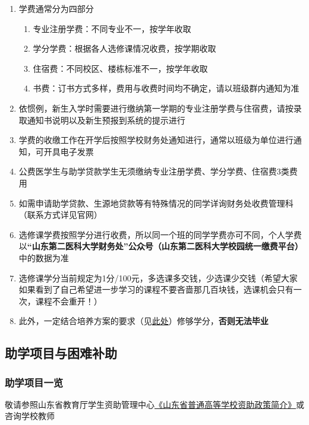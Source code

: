 \begin{enumerate}
    \item 学费通常分为四部分\footnotemark
          \begin{enumerate}
              \item 专业注册学费：不同专业不一，按学年收取
              \item 学分学费：根据各人选修课情况收费，按学期收取
              \item 住宿费：不同校区、楼栋标准不一，按学年收取
              \item 书费：订书方式多样，费用与收费时间均不确定，请以班级群内通知为准
          \end{enumerate}
    \item 依惯例，新生入学时需要进行缴纳第一学期的专业注册学费与住宿费，请按录取通知书说明以及新生预报到系统\footnotemark 的提示进行
    \item 学费的收缴工作在开学后按照学校财务处通知进行，通常以班级为单位进行通知，可开具电子发票
    \item 公费医学生与助学贷款学生无须缴纳专业注册学费、学分学费、住宿费3类费用
    \item 如需申请助学贷款、生源地贷款等有特殊情况的同学详询财务处收费管理科（联系方式详见官网）
    \item 选修课学费按照学分进行收费，所以同一个班的同学学费亦可不同，个人学费以\textbf{“山东第二医科大学财务处”公众号（山东第二医科大学校园统一缴费平台）}中的数据为准
    \item 选修课学分当前规定为1分/100元，多选课多交钱，少选课少交钱（希望大家如果看到了自己希望进一步学习的课程不要吝啬那几百块钱，选课机会只有一次，课程不会重开！）
    \item 此外，一定结合培养方案的要求（见\hyperref[score]{此处}）修够学分，\textbf{否则无法毕业}
\end{enumerate}

\subsection[助学项目与困难补助]{助学项目与困难补助}
\subsubsection[助学项目一览]{助学项目一览}
敬请参照山东省教育厅学生资助管理中心\href{https://sdxszz.sdei.edu.cn/Show/7784}{《山东省普通高等学校资助政策简介》}或咨询学校教师
